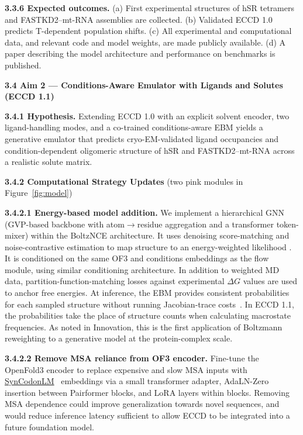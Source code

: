 \documentclass[11pt]{article}
\newcommand{\ECCD}{ECCD\xspace}
\begin{document}
\textbf{3.3.6 Expected outcomes.} (a) First experimental structures of hSR tetramers and FASTKD2--mt-RNA assemblies are collected. (b) Validated \ECCD 1.0 predicts T-dependent population shifts. (c) All experimental and computational data, and relevant code and model weights, are made publicly available. (d) A paper describing the model architecture and performance on benchmarks is published.


\textbf{3.4 Aim 2 --- Conditions-Aware Emulator with Ligands and Solutes (\ECCD 1.1)}

\textbf{3.4.1 Hypothesis.} Extending \ECCD 1.0 with an explicit solvent encoder, two ligand-handling modes, and a co-trained conditions-aware EBM yields a generative emulator that predicts cryo-EM-validated ligand occupancies and condition-dependent oligomeric structure of hSR and FASTKD2--mt-RNA across a realistic solute matrix.

\textbf{3.4.2 Computational Strategy Updates} (two pink modules in Figure~\ref{fig:model})

\textbf{3.4.2.1 Energy-based model addition.} We implement a hierarchical GNN (GVP-based backbone with atom$\rightarrow$residue aggregation and a transformer token-mixer) within the BoltzNCE architecture. It uses denoising score-matching and noise-contrastive estimation to map structure to an energy-weighted likelihood \cite{pengmei_Hierarchical_2025,aggarwal_BoltzNCE_2025}. It is conditioned on the same OF3 and conditions embeddings as the flow module, using similar conditioning architecture. In addition to weighted MD data, partition-function-matching losses against experimental $\Delta G$ values are used to anchor free energies. At inference, the EBM provides consistent probabilities for each sampled structure without running Jacobian-trace costs~\cite{gloy_HollowFlow_2025,aggarwal_BoltzNCE_2025}. In ECCD 1.1, the probabilities take the place of structure counts when calculating macrostate frequencies. As noted in Innovation, this is the first application of Boltzmann reweighting to a generative model at the protein-complex scale.

\textbf{3.4.2.2 Remove MSA reliance from OF3 encoder.} Fine-tune the OpenFold3 encoder to replace expensive and slow MSA inputs with \uline{SynCodonLM}~\cite{heuschkel_Advancing_2026} embeddings via a small transformer adapter, AdaLN-Zero insertion between Pairformer blocks, and LoRA layers within blocks. Removing MSA dependence could improve generalization towards novel sequences, and would reduce inference latency sufficient to allow ECCD to be integrated into a future foundation model.
\end{document}
